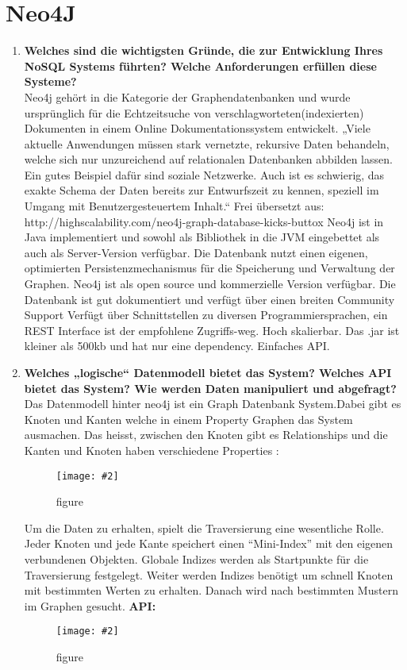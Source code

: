 \documentclass[a4paper,10pt,titlepage=false]{scrreprt}
\newcommand{\pic}[2][figure]{\begin{figure}[h]
 \centering
 \texttt{[image: \#2]}
 \caption{#1}
\end{figure}
}
\begin{document}
\section{Neo4J} %
\label{sec:neo4j}
\begin{enumerate}
  \item \textbf{Welches sind die wichtigsten Gründe, die zur Entwicklung Ihres NoSQL Systems führten? Welche Anforderungen erfüllen diese Systeme?}\\
  Neo4j gehört in die Kategorie der Graphendatenbanken und wurde ursprünglich für die Echtzeitsuche von verschlagworteten(indexierten) Dokumenten in einem Online Dokumentationssystem entwickelt.
„Viele aktuelle Anwendungen müssen stark vernetzte, rekursive Daten behandeln, welche sich nur unzureichend auf relationalen Datenbanken abbilden lassen. Ein gutes Beispiel dafür sind soziale Netzwerke. Auch ist es schwierig, das exakte Schema der Daten bereits zur Entwurfszeit zu kennen, speziell im Umgang mit Benutzergesteuertem Inhalt.“
Frei übersetzt aus: http://highscalability.com/neo4j-graph-database-kicks-buttox
Neo4j ist in Java implementiert und sowohl als Bibliothek in die JVM eingebettet als auch als Server-Version verfügbar. Die Datenbank nutzt einen eigenen, optimierten Persistenzmechanismus für die Speicherung und Verwaltung der Graphen.
Neo4j ist als open source und kommerzielle Version verfügbar.
Die Datenbank ist gut dokumentiert und verfügt über einen breiten Community Support
Verfügt über Schnittstellen zu diversen Programmiersprachen, ein REST Interface ist der empfohlene Zugriffs-weg.
Hoch skalierbar.
Das .jar ist kleiner als 500kb und hat nur eine dependency.
Einfaches API.
\item \textbf{Welches „logische“ Datenmodell bietet das System? Welches API bietet das System? Wie werden Daten manipuliert und abgefragt?}\\
Das Datenmodell hinter neo4j ist ein Graph Datenbank System.Dabei gibt es Knoten und Kanten welche in einem Property Graphen das System ausmachen. Das heisst, zwischen den Knoten gibt es Relationships und die Kanten und Knoten haben verschiedene Properties :
\pic{n4jkk.png}
Um die Daten zu erhalten, spielt die Traversierung eine wesentliche Rolle. Jeder Knoten und jede Kante speichert einen “Mini-Index” mit den eigenen verbundenen Objekten. Globale Indizes werden als Startpunkte für die Traversierung festgelegt. Weiter werden Indizes benötigt um schnell Knoten mit bestimmten Werten zu erhalten. Danach wird nach bestimmten Mustern im Graphen gesucht.\newpage
\textbf{API:}  \pic{n4japi.png} 

\end{enumerate}
\end{document}
